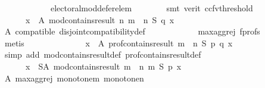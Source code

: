 \begin{isabellebody}
\ \ \ \ \ \ \ \ \ \ \ \ electoral{\isacharunderscore}{\kern0pt}mod{\isacharunderscore}{\kern0pt}defer{\isacharunderscore}{\kern0pt}elem\isanewline
\ \ \ \ \ \ \isamarkupfalse%
\ {\isacharparenleft}{\kern0pt}smt\ {\isacharparenleft}{\kern0pt}verit{\isacharcomma}{\kern0pt}\ ccfv{\isacharunderscore}{\kern0pt}threshold{\isacharparenright}{\kern0pt}{\isacharparenright}{\kern0pt}\isanewline
\ \ \ \ \isamarkupfalse%
\ \isamarkupfalse%
\isanewline
\ \ \ \ \ \ {\isachardoublequoteopen}{\isasymforall}x\ {\isasymin}\ A{\isachardot}{\kern0pt}\ mod{\isacharunderscore}{\kern0pt}contains{\isacharunderscore}{\kern0pt}result\ n\ {\isacharparenleft}{\kern0pt}m\ {\isasymparallel}\isactrlsub {\isasymup}\ n{\isacharparenright}{\kern0pt}\ S\ q\ x{\isachardoublequoteclose}\isanewline
\ \ \ \ \ \ \isamarkupfalse%
\ A\ compatible\ disjoint{\isacharunderscore}{\kern0pt}compatibility{\isacharunderscore}{\kern0pt}def\isanewline
\ \ \ \ \ \ \ \ \ \ \ \ max{\isacharunderscore}{\kern0pt}agg{\isacharunderscore}{\kern0pt}rej{}\ f{\isacharunderscore}{\kern0pt}profs\isanewline
\ \ \ \ \ \ \isamarkupfalse%
\ metis\isanewline
\ \ \ \ \isamarkupfalse%
\ \isamarkupfalse%
\ {}{}{\isacharcolon}{\kern0pt}\isanewline
\ \ \ \ \ \ {\isachardoublequoteopen}{\isasymforall}x\ {\isasymin}\ A{\isachardot}{\kern0pt}\ prof{\isacharunderscore}{\kern0pt}contains{\isacharunderscore}{\kern0pt}result\ {\isacharparenleft}{\kern0pt}m\ {\isasymparallel}\isactrlsub {\isasymup}\ n{\isacharparenright}{\kern0pt}\ S\ p\ q\ x{\isachardoublequoteclose}\isanewline
\ \ \ \ \ \ \isamarkupfalse%
\ {\isacharparenleft}{\kern0pt}simp\ add{\isacharcolon}{\kern0pt}\ mod{\isacharunderscore}{\kern0pt}contains{\isacharunderscore}{\kern0pt}result{\isacharunderscore}{\kern0pt}def\ prof{\isacharunderscore}{\kern0pt}contains{\isacharunderscore}{\kern0pt}result{\isacharunderscore}{\kern0pt}def{\isacharparenright}{\kern0pt}\isanewline
\ \ \ \ \isamarkupfalse%
\isanewline
\ \ \ \ \ \ {\isachardoublequoteopen}{\isasymforall}x\ {\isasymin}\ S{\isacharminus}{\kern0pt}A{\isachardot}{\kern0pt}\ mod{\isacharunderscore}{\kern0pt}contains{\isacharunderscore}{\kern0pt}result\ {\isacharparenleft}{\kern0pt}m\ {\isasymparallel}\isactrlsub {\isasymup}\ n{\isacharparenright}{\kern0pt}\ m\ S\ p\ x{\isachardoublequoteclose}\isanewline
\ \ \ \ \ \ \isamarkupfalse%
\ A\ max{\isacharunderscore}{\kern0pt}agg{\isacharunderscore}{\kern0pt}rej{}\ monotone{\isacharunderscore}{\kern0pt}m\ monotone{\isacharunderscore}{\kern0pt}n\isanewline

\end{isabellebody}
